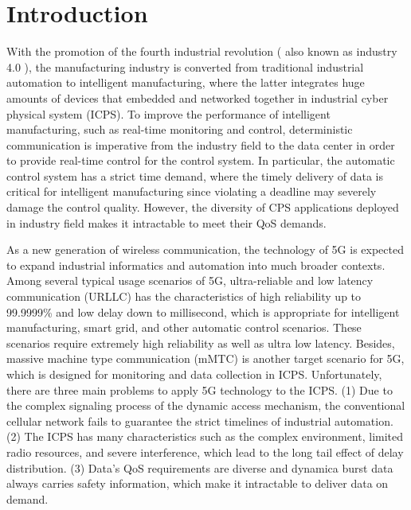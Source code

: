 \documentclass{SCIS2021}
\begin{document}

	\maketitle


	\section{Introduction}
	\label{sec:introduction}
	{\color{blue}With the promotion of the fourth industrial revolution ( also known as industry 4.0 ), the manufacturing industry is converted from traditional industrial automation to intelligent manufacturing, where the latter integrates huge amounts of devices that embedded and networked together in industrial cyber physical system (ICPS)\cite{zhou2021temperature}. To improve the performance of intelligent manufacturing, such as real-time monitoring and control, deterministic communication is imperative from the industry field to the data center in order to provide real-time control for the control system. In particular, the automatic control system has a strict time demand, where the timely delivery of data is critical for intelligent manufacturing since violating a deadline may severely damage the control quality. However, the diversity of CPS applications deployed in industry field makes it intractable to meet their QoS demands\cite{zhou2020siamese}.}


	\par As a new generation of wireless communication, the technology of 5G is expected to expand industrial informatics and automation into much broader contexts\cite{li2018predictive}. {\color{black}Among several typical usage} scenarios of 5G, ultra-reliable and low latency communication (URLLC) has the characteristics of high reliability up to 99.9999\% and low delay down to millisecond\cite{li2019learning}, which is appropriate for intelligent manufacturing, smart grid, and other automatic control scenarios. These scenarios require extremely high reliability {\color{black}as well as ultra low latency}. Besides, massive machine type communication (mMTC) is another target scenario for 5G, which is designed for monitoring and data collection in {\color{black}ICPS}. Unfortunately, there are three main problems to apply 5G technology to the {\color{black}ICPS}. (1) Due to the complex signaling process of the dynamic access mechanism, the conventional cellular network fails to guarantee the strict timelines of industrial automation. (2) The {\color{black}ICPS} has many characteristics such as the complex environment, limited radio resources, and severe interference, which lead to the long tail effect of delay distribution. (3) Data's QoS requirements are diverse and {\color{black}dynamica burst data always carries safety information}, which make it intractable to deliver data on demand.
\end{document}
